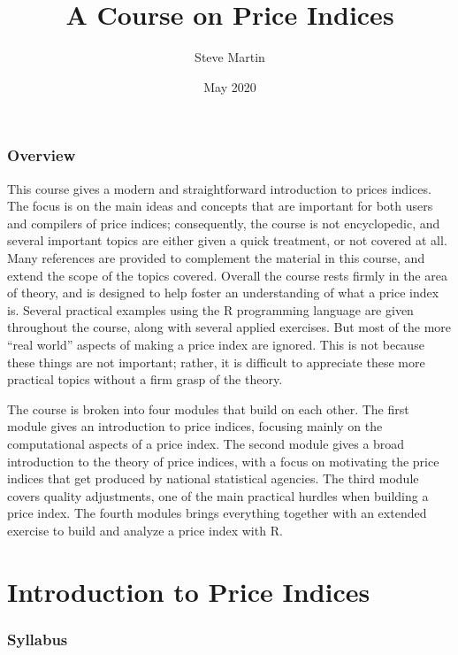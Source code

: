 \documentclass[]{article}
\title{A Course on Price Indices}
\author{Steve Martin}
\date{May 2020}
\begin{document}
\maketitle

{
\setcounter{tocdepth}{2}
\tableofcontents
}
\hypertarget{overview}{%
\section*{Overview}\label{overview}}

This course gives a modern and straightforward introduction to prices indices. The focus is on the main ideas and concepts that are important for both users and compilers of price indices; consequently, the course is not encyclopedic, and several important topics are either given a quick treatment, or not covered at all. Many references are provided to complement the material in this course, and extend the scope of the topics covered. Overall the course rests firmly in the area of theory, and is designed to help foster an understanding of what a price index is. Several practical examples using the R programming language are given throughout the course, along with several applied exercises. But most of the more ``real world'' aspects of making a price index are ignored. This is not because these things are not important; rather, it is difficult to appreciate these more practical topics without a firm grasp of the theory.

The course is broken into four modules that build on each other. The first module gives an introduction to price indices, focusing mainly on the computational aspects of a price index. The second module gives a broad introduction to the theory of price indices, with a focus on motivating the price indices that get produced by national statistical agencies. The third module covers quality adjustments, one of the main practical hurdles when building a price index. The fourth modules brings everything together with an extended exercise to build and analyze a price index with R.

\hypertarget{part-introduction-to-price-indices}{%
\part{Introduction to Price Indices}\label{part-introduction-to-price-indices}}

\hypertarget{syllabus}{%
\section{Syllabus}\label{syllabus}}
\end{document}
